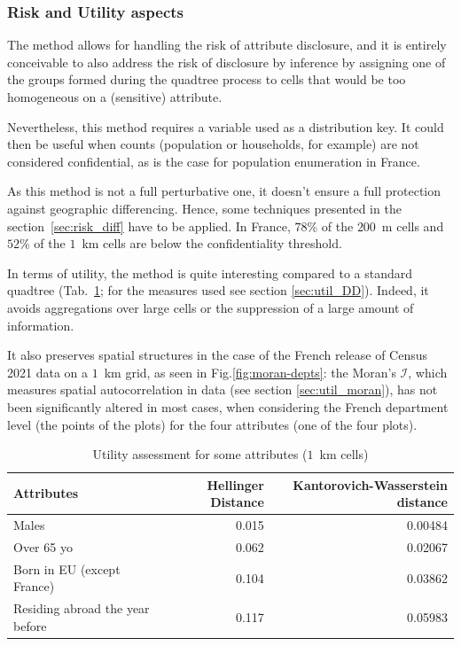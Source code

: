 \subsubsection{Risk and Utility aspects}

The method allows for handling the risk of attribute disclosure, and it is entirely conceivable to also address the risk of disclosure by inference by assigning one of the groups formed during the quadtree process to cells that would be too homogeneous on a (sensitive) attribute.

Nevertheless, this method  requires a variable used as a distribution key. It could then be useful when counts (population or households, for example) are not considered confidential, as is the case for population enumeration in France.

As this method is not a full perturbative one, it doesn't ensure a full protection against geographic differencing. Hence, some techniques presented in the section~\ref{sec:risk_diff} have to be applied.
In France, $78$\% of the $200$~m cells and $52$\% of the $1$~km cells are below the confidentiality threshold. 

In terms of utility, the method is quite interesting compared to a standard quadtree (Tab.~\ref{tab:insee_hell_kwd}; for the measures used see section \ref{sec:util_DD}). Indeed, it avoids aggregations over large cells or the suppression of a large amount of information.

It also preserves spatial structures in the case of the French release of Census 2021 data on a $1$~km grid, as seen in Fig.\ref{fig:moran-depts}: the Moran's $\mathcal{I}$, which measures spatial autocorrelation in data (see section \ref{sec:util_moran}), has not been significantly altered in most cases, when considering the French department level (the points of the plots) for the four attributes (one of the four plots).

\begin{table}[H]
\footnotesize
\caption{Utility assessment for some attributes ($1$~km cells)}\label{tab:insee_hell_kwd} 
\centering
\begin{tabular}[t]{lrr}
\toprule
Attributes & Hellinger Distance & Kantorovich-Wasserstein distance \\
\midrule
Males & 0.015 & 0.00484 \\
Over 65 yo & 0.062 & 0.02067 \\
Born in EU (except France) & 0.104 & 0.03862 \\
Residing abroad the year before & 0.117 & 0.05983\\
\bottomrule
\end{tabular}
\end{table}


